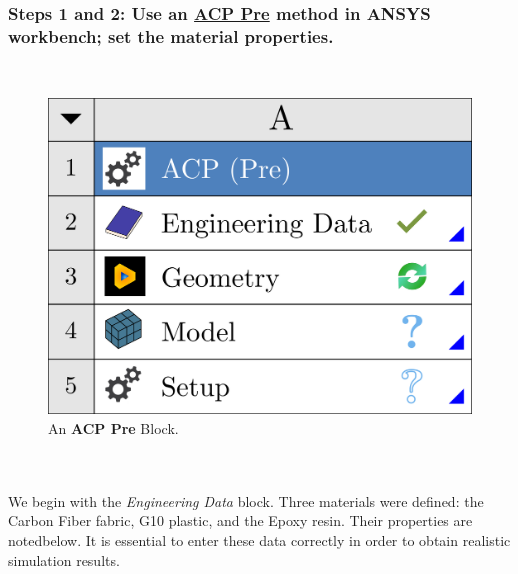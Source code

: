 \documentclass{amsdtx}
\begin{document}
\subsubsection{Steps 1 and 2: Use an \underline{ACP Pre} method in ANSYS workbench; set the material properties.}~
\begin{multicols}{2}
	
\begin{figure}[H]
\centering
\includegraphics[scale=0.04]{ACPpre.pdf}	
\caption{An \textbf{ACP Pre} Block.}
\end{figure}
~\\\\We begin with the \textit{Engineering Data} block. Three materials were defined: the Carbon Fiber fabric, G10 plastic, and the Epoxy resin. Their properties are notedbelow. It is essential to enter these data correctly in order to obtain realistic simulation results.
\end{multicols}
\end{document}
